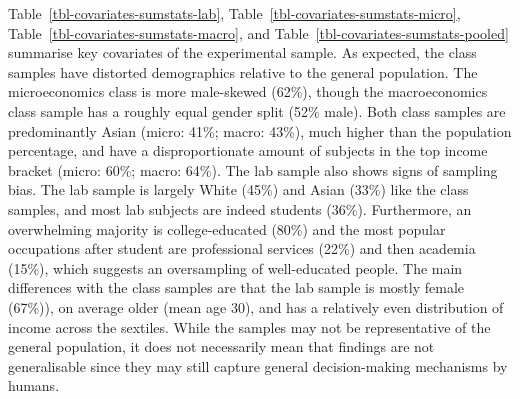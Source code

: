 \documentclass[12pt, letterpaper, DIV=11, numbers=noendperiod]{article}
\begin{document}
\begin{table}
\centering
{\par}
\caption{Covariate balance for pooled sample}\label{tbl-covariates-sumstats-pooled}
\end{table}

Table~\ref{tbl-covariates-sumstats-lab}, Table~\ref{tbl-covariates-sumstats-micro}, Table~\ref{tbl-covariates-sumstats-macro}, and Table~\ref{tbl-covariates-sumstats-pooled} summarise key covariates of the experimental sample. As expected, the class samples have distorted demographics relative to the general population. The microeconomics class is more male-skewed (62\%), though the macroeconomics class sample has a roughly equal gender split (52\% male). Both class samples are predominantly Asian (micro: 41\%; macro: 43\%), much higher than the population percentage, and have a disproportionate amount of subjects in the top income bracket (micro: 60\%; macro: 64\%). The lab sample also shows signs of sampling bias. The lab sample is largely White (45\%) and Asian (33\%) like the class samples, and most lab subjects are indeed students (36\%). Furthermore, an overwhelming majority is college-educated (80\%) and the most popular occupations after student are professional services (22\%) and then academia (15\%), which suggests an oversampling of well-educated people. The main differences with the class samples are that the lab sample is mostly female (67\%)), on average older (mean age 30), and has a relatively even distribution of income across the sextiles. While the samples may not be representative of the general population, it does not necessarily mean that findings are not generalisable since they may still capture general decision-making mechanisms by humans.
\end{document}
